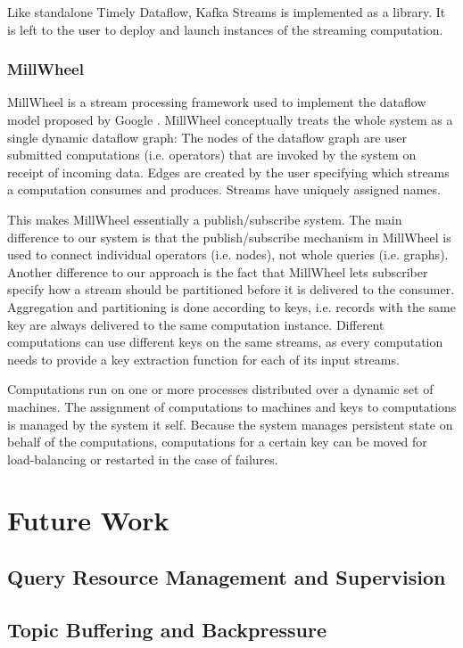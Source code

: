 Like standalone Timely Dataflow, Kafka Streams is implemented as a library. It
is left to the user to deploy and launch instances of the streaming computation.

\subsubsection{MillWheel}

MillWheel \cite{millwheel} is a stream processing framework used to implement
the dataflow model proposed by Google \cite{google}. MillWheel conceptually
treats the whole system as a single dynamic dataflow graph: The nodes of the
dataflow graph are user submitted computations (i.e. operators) that are
invoked by the system on receipt of incoming data. Edges are created by the
user specifying which streams a computation consumes and produces. Streams
have uniquely assigned names.

This makes MillWheel essentially a publish/subscribe system. The main difference
to our system is that the publish/subscribe mechanism in MillWheel is used to
connect individual operators (i.e. nodes), not whole queries (i.e. graphs).
Another difference to our approach is the fact that MillWheel lets subscriber
specify how a stream should be partitioned before it is delivered to the consumer.
Aggregation and partitioning is done according to keys, i.e. records with the
same key are always delivered to the same computation instance. Different
computations can use different keys on the same streams, as every computation
needs to provide a key extraction function for each of its input streams.

Computations run on one or more processes distributed over a dynamic set of
machines. The assignment of computations to machines and keys to computations
is managed by the system it self. Because the system manages persistent state
on behalf of the computations, computations for a certain key can be moved
for load-balancing or restarted in the case of failures.

\section{Future Work}

\subsection{Query Resource Management and Supervision}

\subsection{Topic Buffering and Backpressure}

